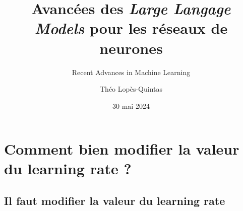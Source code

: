 \documentclass{beamer}
\title[]{Avancées des \emph{Large Langage Models} pour les réseaux de neurones}
\subtitle{Recent Advances in Machine Learning}
\author[]{Théo Lopès-Quintas}
\institute{
    BPCE Payment Services, \\
    Université Paris Dauphine}
\date{30 mai 2024}
\begin{document}
{
\begin{frame}
	\titlepage
\end{frame}
}
\addtocounter{framenumber}{-1}




\AtBeginSection[]
{
    \begin{frame}
        \frametitle{}
        \tableofcontents[currentsection]
    \end{frame}
}




\section{Comment bien modifier la valeur du learning rate ?}

\subsection{Il faut modifier la valeur du learning rate}
\end{document}
